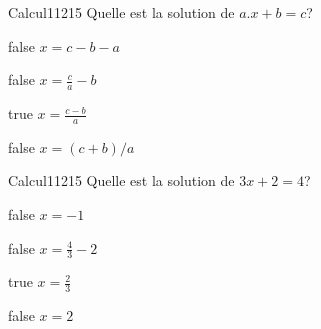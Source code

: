         	\begin{question}{8}{Calcul}{1}{1215}
				Quelle est la solution de $a.x+b=c$?
            \end{question}
            \begin{reponses}
            	\item[false] $x=c-b-a$
            	\item[false] $x=\frac{c}{a}-b$
                \item[true] $x=\frac{c-b}{a}$
                \item[false] $x=(c+b)/a$
            \end{reponses}
        	\begin{question}{8}{Calcul}{1}{1215}
				Quelle est la solution de $3x+2=4$?
            \end{question}
            \begin{reponses}
            	\item[false] $x=-1$
            	\item[false] $x=\frac{4}{3}-2$
                \item[true] $x=\frac{2}{3}$
                \item[false] $x=2$
            \end{reponses}
